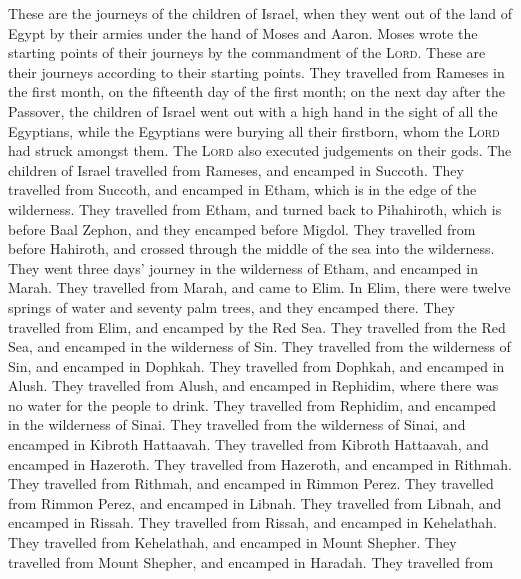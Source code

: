  These are the journeys of the children of Israel, when
they went out of the land of Egypt by their armies under the hand of
Moses and Aaron.  Moses wrote the starting points of their
journeys by the commandment of the \textsc{Lord}. These are their
journeys according to their starting points.  They
travelled from Rameses in the first month, on the fifteenth day of the
first month; on the next day after the Passover, the children of Israel
went out with a high hand in the sight of all the Egyptians,
 while the Egyptians were burying all their firstborn,
whom the \textsc{Lord} had struck amongst them. The \textsc{Lord} also
executed judgements on their gods.  The children of Israel
travelled from Rameses, and encamped in Succoth.  They
travelled from Succoth, and encamped in Etham, which is in the edge of
the wilderness.  They travelled from Etham, and turned
back to Pihahiroth, which is before Baal Zephon, and they encamped
before Migdol.  They travelled from before Hahiroth, and
crossed through the middle of the sea into the wilderness. They went
three days' journey in the wilderness of Etham, and encamped in Marah.
 They travelled from Marah, and came to Elim. In Elim,
there were twelve springs of water and seventy palm trees, and they
encamped there.  They travelled from Elim, and encamped
by the Red Sea.  They travelled from the Red Sea, and
encamped in the wilderness of Sin.  They travelled from
the wilderness of Sin, and encamped in Dophkah.  They
travelled from Dophkah, and encamped in Alush.  They
travelled from Alush, and encamped in Rephidim, where there was no water
for the people to drink.  They travelled from Rephidim,
and encamped in the wilderness of Sinai.  They travelled
from the wilderness of Sinai, and encamped in Kibroth Hattaavah.
 They travelled from Kibroth Hattaavah, and encamped in
Hazeroth.  They travelled from Hazeroth, and encamped in
Rithmah.  They travelled from Rithmah, and encamped in
Rimmon Perez.  They travelled from Rimmon Perez, and
encamped in Libnah.  They travelled from Libnah, and
encamped in Rissah.  They travelled from Rissah, and
encamped in Kehelathah.  They travelled from Kehelathah,
and encamped in Mount Shepher.  They travelled from Mount
Shepher, and encamped in Haradah.  They travelled from

